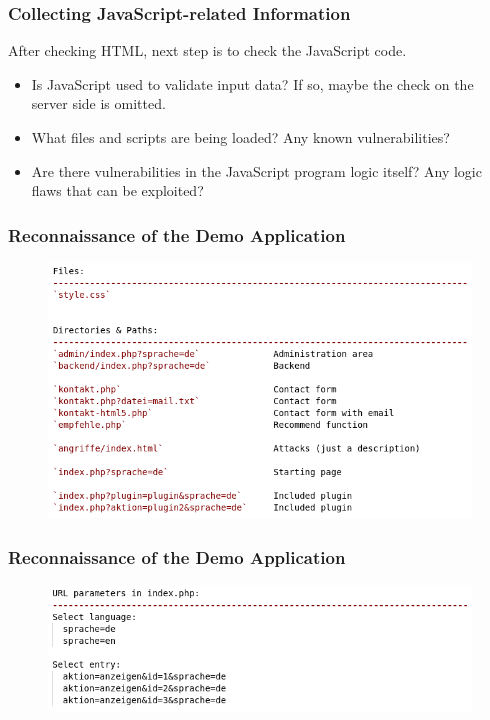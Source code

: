 \documentclass[aspectratio=169]{beamer}
\begin{document}
\begin{frame}
    \frametitle{Collecting JavaScript-related Information}
    After checking HTML, next step is to check the JavaScript code.
    \vfill
    \begin{itemize}
        \item Is JavaScript used to validate input data? If so, maybe the check on the server side is omitted. 
        \item What files and scripts are being loaded? Any known vulnerabilities?
        \item Are there vulnerabilities in the JavaScript program logic itself? Any logic flaws that can be exploited?
    \end{itemize}   
\end{frame}


\begin{frame}
    \frametitle{Reconnaissance of the Demo Application}
    \begin{figure}
        \centering
        \includegraphics[scale=.4]{img/01-recon/recon-files-directories-paths.png}        
    \end{figure}
\end{frame}

\begin{frame}
    \frametitle{Reconnaissance of the Demo Application}
    \begin{figure}
        \centering
        \includegraphics[scale=.4]{img/01-recon/recon-url-parameters.png}        
    \end{figure}
\end{frame}
\end{document}
